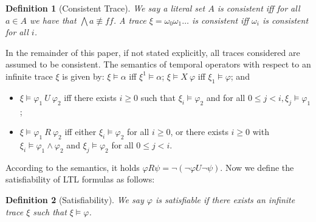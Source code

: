 \documentclass[conference]{IEEEtran}
\newtheorem{definition}{Definition}
\def\phi{\varphi}
\def\ff{\mathit{ff}}
\begin{document}
\begin{definition}[Consistent Trace]
  We say a literal set $A$ is \emph{consistent} iff for all $a\in A$
  we have that $\bigwedge a\not\equiv\ff$. A trace $\xi=\omega_0\omega_1\ldots$ is
  consistent iff $\omega_i$ is consistent for all $i$.
\end{definition}

In the remainder of this paper, if not stated explicitly, all traces
considered are assumed to be consistent. 
\fi
The semantics of temporal operators with respect to an infinite trace $\xi$ is 
given by: $\xi\models \alpha$ iff $\xi^1\models\alpha$;
$\xi \models X\ \phi$ iff $\xi_1\models \phi$; and
\begin{itemize}
\item $\xi \models \phi_1\ U\ \phi_2$ iff there exists $i\geqslant 0$
such that $\xi_i\models \phi_2$ and for all $0 \leqslant j < i,
\xi_j\models \phi_1$;
\item $\xi \models \phi_1\ R\ \phi_2$ iff either
  $\xi_i\vDash\phi_2$ for all $i\geq 0$, or there exists $i\ge 0$
  with $\xi_i\models\phi_1\wedge\phi_2$ and $\xi_j\vDash\phi_2$ for
  all $0\leq j< i$.
\end{itemize}
According to the semantics, it holds $\phi R\psi=\neg (\neg \phi U\neg
\psi)$. Now we define the satisfiability of LTL formulas as follows:

\begin{definition}[Satisfiability]
We say $\phi$ is satisfiable if there
exists an infinite trace $\xi$ such that $\xi\models\phi$.
\end{definition}




\iffalse
\textbf{Notation.} We define some notation that we use throughout this 
paper.
\begin{itemize}
\item For a formula $\phi$, we use $cl(\phi)$ to denote the set of
  subformulas of $\phi$. We denote by $AP_\phi$ the set of atoms
  appearing in $\phi$, by $L_\phi$ the set of literals over $AP_\phi$,
  and by $\Sigma_\phi$ the set of consistent literal sets over $AP_\phi$.
\item Let $\phi = \bigwedge_{i\in I} \phi_i$ such that the root
operator of $\phi_i$ is not a conjunctive.  We define the set of
conjuncts of $\phi$ as $CF(\phi):=\{\phi_i \mid i\in I\}$.
When $\phi$ does not include a conjunctive as a root operator,
$\mathit{CF}(\phi)$ includes only $\phi$ itself. The set of
disjuncts $DF(\phi)$ is defined in an analogous way.
\iffalse
\item 
For a formula $\phi$ of the form $\phi_1 U \phi_2$ or $\phi_1 R \phi_2$,
let $\mathit{left}(\phi)$ ($\mathit{right}(\phi)$) be left (right) 
subformulas of $\phi$.
\fi
\item For all propositional formula
$\alpha$ appearing in the paper, we always check first whether
$\alpha$ is satisfiable. If not, we shall replace $\alpha$ by $\ff$.
\end{itemize}
\fi
\end{document}
